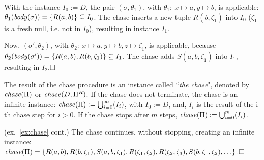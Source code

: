 \documentclass[format=acmsmall, review=false, screen=true]{acmart}
\newcommand{\boxtheorem}{\ensuremath{\hfill \Box}}
\newcommand{\nit}[1]{{\it #1}}
\newcommand{\rules}{\Pi^{R}}
\begin{document}
{{\begin{example}
With the instance $I_0:=D$, the pair $(\sigma, \theta_1)$, with $\theta_1\!: \ x\mapsto a, y\mapsto b$, is applicable: $\theta_1(\nit{body}(\sigma))=\{R(a,b)\} \subseteq I_0$. The chase inserts a new tuple $R(b,\zeta_1)$ into $I_0$ ($\zeta_1$ is a fresh null, i.e. not in $I_0$), resulting in instance $I_1$. %

Now, $(\sigma',\theta_2)$, with $\theta_2\!: \ x\mapsto a, y\mapsto b, z\mapsto \zeta_1$, is applicable, because $\theta_2(\nit{body}(\sigma'))=\{R(a,b),R(b,\zeta_1)\} \subseteq I_1$. The chase adds $S(a,b,\zeta_1)$ into $I_1$, resulting in $I_2$.\boxtheorem
\end{example}


The result of the chase procedure is an instance called ``{\em the chase}", denoted by ${\it chase}(\Pi)$ or ${\it chase}(D,\rules)$. If the chase does not terminate, the chase is an infinite instance: ${\it chase}(\Pi):=\bigcup_{i=0}^\infty(I_i)$, with $I_0:=D$, and, $I_i$ is the result of the i-th chase step for $i > 0$. If the chase stops after $m$ steps, ${\it chase}(\Pi):=\bigcup_{i=0}^m(I_i)$. %

\begin{example} (ex.~\ref{ex:chase} cont.) The chase continues, without stopping, creating an infinite instance: ${\it chase}(\Pi) = \{R(a,b), R(b,\zeta_1), S(a,b,\zeta_1), R(\zeta_1,\zeta_2), R(\zeta_2,\zeta_3), S(b,\zeta_1,\zeta_2), \ldots\}$.\boxtheorem
\end{example}





}}
\end{document}
